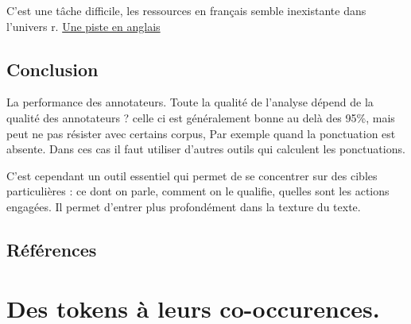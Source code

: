 \documentclass[
  letterpaper,
  DIV=11,
  numbers=noendperiod]{scrreprt}
\begin{document}
C'est une tâche difficile, les ressources en français semble inexistante
dans l'univers r.
\href{https://www.rdocumentation.org/packages/cleanNLP/versions/1.9.0/topics/get_coreference}{Une
piste en anglais}

\section{Conclusion}\label{conclusion-6}

La performance des annotateurs. Toute la qualité de l'analyse dépend de
la qualité des annotateurs ? celle ci est généralement bonne au delà des
95\%, mais peut ne pas résister avec certains corpus, Par exemple quand
la ponctuation est absente. Dans ces cas il faut utiliser d'autres
outils qui calculent les ponctuations.

C'est cependant un outil essentiel qui permet de se concentrer sur des
cibles particulières : ce dont on parle, comment on le qualifie, quelles
sont les actions engagées. Il permet d'entrer plus profondément dans la
texture du texte.

\section{Références}\label{ruxe9fuxe9rences}


\chapter{Des tokens à leurs
co-occurences.}\label{des-tokens-uxe0-leurs-co-occurences.}
\end{document}
